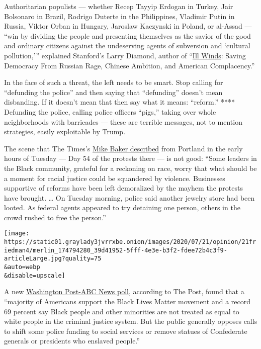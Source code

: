 Authoritarian populists --- whether Recep Tayyip Erdogan in Turkey, Jair
Bolsonaro in Brazil, Rodrigo Duterte in the Philippines, Vladimir Putin
in Russia, Viktor Orban in Hungary, Jaroslaw Kaczynski in Poland, or
al-Assad --- ``win by dividing the people and presenting themselves as
the savior of the good and ordinary citizens against the undeserving
agents of subversion and `cultural pollution,''' explained Stanford's
Larry Diamond, author of
``\href{https://diamond-democracy.stanford.edu/publications/ill-winds-saving-democracy-russian-rage-chinese-ambition-and-american-complacency}{Ill
Winds}: Saving Democracy From Russian Rage, Chinese Ambition, and
American Complacency.''

In the face of such a threat, the left needs to be smart. Stop calling
for ``defunding the police'' and then saying that ``defunding'' doesn't
mean disbanding. If it doesn't mean that then say what it means:
``reform.'' **** Defunding the police, calling police officers ``pigs,''
taking over whole neighborhoods with barricades --- these are terrible
messages, not to mention strategies, easily exploitable by Trump.

The scene that The Times's
\href{https://www.nytimes3xbfgragh.onion/2020/07/21/us/portland-protests.html}{Mike
Baker described} from Portland in the early hours of Tuesday --- Day 54
of the protests there --- is not good: ``Some leaders in the Black
community, grateful for a reckoning on race, worry that what should be a
moment for racial justice could be squandered by violence. Businesses
supportive of reforms have been left demoralized by the mayhem the
protests have brought. \ldots{} On Tuesday morning, police said another
jewelry store had been looted. As federal agents appeared to try
detaining one person, others in the crowd rushed to free the person.''

\texttt{[image: https://static01.graylady3jvrrxbe.onion/images/2020/07/21/opinion/21friedman4/merlin\_174794280\_39d41952-5fff-4e3e-b3f2-fdee72b4c3f9-articleLarge.jpg?quality=75\\\&auto=webp\\\&disable=upscale]}

A new \href{https://wapo.st/3jiOiyp}{Washington Post-ABC News poll,}
according to The Post, found that a ``majority of Americans support the
Black Lives Matter movement and a record 69 percent say Black people and
other minorities are not treated as equal to white people in the
criminal justice system. But the public generally opposes calls to shift
some police funding to social services or remove statues of Confederate
generals or presidents who enslaved people.''

